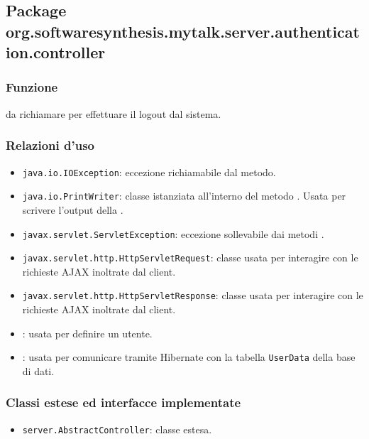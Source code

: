 \subsection{Package org.softwaresynthesis.mytalk.server.authentication.controller}\label{sec:autservlet}


\subsubsection*{Funzione}
 da richiamare per effettuare il logout dal sistema.

\subsubsection*{Relazioni d'uso}
\begin{itemize}
	\item \texttt{java.io.IOException}: eccezione richiamabile dal metodo.
	\item \texttt{java.io.PrintWriter}: classe istanziata all'interno del metodo . Usata per scrivere l'output della .
	\item \texttt{javax.servlet.ServletException}: eccezione sollevabile dai metodi .
	\item \texttt{javax.servlet.http.HttpServletRequest}: classe usata per interagire con le richieste AJAX inoltrate dal client.
	\item \texttt{javax.servlet.http.HttpServletResponse}: classe usata per interagire con le richieste AJAX inoltrate dal client.
	\item {}: usata per definire un utente.
	\item {}: usata per comunicare tramite Hibernate con la tabella \texttt{UserData} della base di dati.
\end{itemize}

\subsubsection*{Classi estese ed interfacce implementate}
\begin{itemize}
	\item \texttt{server.AbstractController}: classe estesa.
\end{itemize}

